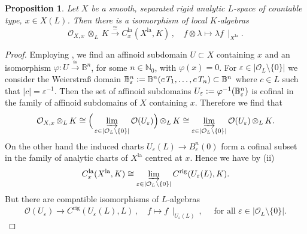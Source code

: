 \documentclass[a4paper, reqno, 10pt]{amsart}
\newtheorem{proposition}[theorem]{Proposition}
\theoremstyle{definition}
\numberwithin{equation}{section}
\newcommand{\abs}[1]{{\lvert{#1}\rvert}}
\newcommand{\botimes}[1]{{\,\otimes_{#1}\,}}
\newcommand{\defeq}{\vcentcolon=}
\newcommand{\la}{{\mathrm{la}}}
\newcommand{\lra}{\longrightarrow}
\newcommand{\lto}{\longmapsto}
\newcommand{\ra}{\rightarrow}
\newcommand{\res}[1]{{\!\,\mid_{#1}}}
\newcommand{\rig}{{\mathrm{rig}}}
\newcommand{\BB}{{\mathbb {B}}}
\newcommand{\BN}{{\mathbb {N}}}
\newcommand{\CO}{{\mathcal {O}}}
\begin{document}
\begin{proposition}\label{Prop 1 - Isomorphism between rigid analytic and locally analytic stalk}
	Let $X$ be a smooth, separated rigid analytic $L$-space of countable type, $x \in X(L)$.
	Then there is a isomorphism of local $K$-algebras
	\begin{equation}\label{Eq 1 - Isomorphism of rigid analytic stalk and locally analytic stalk}
		\CO_{X,x} \botimes{L} K \overset{\cong}{\lra} C^\la_x(X^\la, K) \,,\quad f \otimes \lambda \lto \lambda f\res{X^\la} .
	\end{equation}
\end{proposition}
\begin{proof}
	Employing , we find an affinoid subdomain $U \subset X$ containing $x$ and an isomorphism $\varphi \colon U \xrightarrow{\cong} \BB^n$, for some $n \in \BN_0$, with $\varphi(x) = 0$.
	For $\varepsilon \in \abs{\CO_L \setminus \{0\}}$ we consider the Weierstra{\ss} domain $\BB^n_\varepsilon \defeq \BB^n (c\, T_1,\ldots, c\, T_n) \subset \BB^n$ where $c \in L$ such that $\abs{c} = \varepsilon^{-1}$.
	Then the set of affinoid subdomains $U_\varepsilon \defeq \varphi^{-1}(\BB^n_\varepsilon)$ is cofinal in the family of affinoid subdomains of $X$ containing $x$.
	Therefore we find that
	\begin{equation*}
		\CO_{X,x} \botimes{L} K \cong \Big( \varinjlim_{\varepsilon \in \abs{\CO_L \setminus \{0\}}} \CO(U_\varepsilon) \Big) \botimes{L} K \cong \varinjlim_{\varepsilon \in \abs{\CO_L \setminus \{0\}}} \CO(U_\varepsilon) \botimes{L} K .
	\end{equation*}
	On the other hand the induced charts $U_\varepsilon(L) \ra B_\varepsilon^{n}(0)$ form a cofinal subset in the family of analytic charts of $X^\la$ centred at $x$.
	Hence we have by  (ii)
	\begin{equation*}
		C^\la_x (X^\la, K) \cong \varinjlim_{\varepsilon \in \abs{\CO_L \setminus \{0\}}} C^\rig (U_\varepsilon(L), K) .
	\end{equation*}
	But there are compatible isomorphisms of $L$-algebras
	\begin{equation}\label{Eq 1 - Isomorphism between rigid analytic function and rigid analytic function on manifold}
		\CO (U_\varepsilon) \lra C^\rig (U_\varepsilon(L),L) \,,\quad f \lto f\res{U_\varepsilon(L)} \,, \quad\text{ for all $\varepsilon \in \abs{\CO_L \setminus \{0\}}$.}
	\end{equation}

\end{proof}
\end{document}
